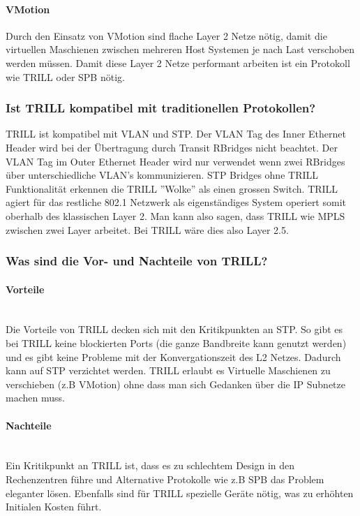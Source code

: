\paragraph{VMotion}
Durch den Einsatz von VMotion sind flache Layer 2 Netze nötig, damit die virtuellen Maschienen zwischen mehreren Host Systemen je nach Last verschoben werden müssen. Damit diese Layer 2 Netze performant arbeiten ist ein Protokoll wie TRILL oder SPB nötig. 


\subsubsection{Ist TRILL kompatibel mit traditionellen Protokollen?} %
TRILL ist kompatibel mit VLAN und STP. Der VLAN Tag des Inner Ethernet Header wird bei der Übertragung durch Transit RBridges nicht beachtet. Der VLAN Tag im Outer Ethernet Header wird nur verwendet wenn zwei RBridges über unterschiedliche VLAN's kommunizieren. STP Bridges ohne TRILL Funktionalität erkennen die TRILL ''Wolke'' als einen grossen Switch. TRILL agiert für das restliche 802.1 Netzwerk als eigenständiges System operiert somit oberhalb des klassischen Layer 2. Man kann also sagen, dass TRILL wie MPLS zwischen zwei Layer arbeitet. Bei TRILL wäre dies also Layer 2.5. 


\subsubsection{Was sind die Vor- und Nachteile von TRILL?}%
\paragraph{Vorteile} \hfill \\
Die Vorteile von TRILL decken sich mit den Kritikpunkten an STP. So gibt es bei TRILL keine blockierten Ports (die ganze Bandbreite kann genutzt werden) und es gibt keine Probleme mit der Konvergationszeit des L2 Netzes. Dadurch kann auf STP verzichtet werden. 
TRILL erlaubt es Virtuelle Maschienen zu verschieben (z.B VMotion) ohne dass man sich Gedanken über die IP Subnetze machen muss.

\paragraph{Nachteile} \hfill \\
Ein Kritikpunkt an TRILL ist, dass es zu schlechtem Design in den Rechenzentren führe und Alternative Protokolle wie z.B SPB das Problem eleganter lösen. Ebenfalls sind für TRILL spezielle Geräte nötig, was zu erhöhten Initialen Kosten führt.

